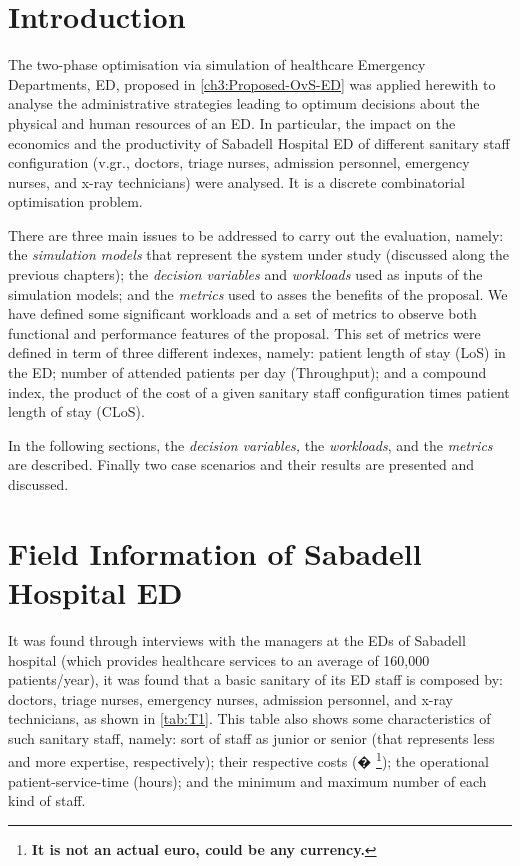 
\section{Introduction}

The two-phase optimisation via simulation of healthcare Emergency
Departments, ED, proposed in \ref{ch3:Proposed-OvS-ED} was applied
herewith to analyse the administrative strategies leading to optimum
decisions about the physical and human resources of an ED. In particular,
the impact on the economics and the productivity of Sabadell Hospital
ED of different sanitary staff configuration (v.gr., doctors, triage
nurses, admission personnel, emergency nurses, and x-ray technicians)
were analysed. It is a discrete combinatorial optimisation problem.

There are three main issues to be addressed to carry out the evaluation,
namely: the \textit{simulation models} that represent the system under
study (discussed along the previous chapters); the \textit{decision
variables} and\textit{ workloads} used as inputs of the simulation
models; and the \textit{metrics} used to asses the benefits of the
proposal. We have defined some significant workloads and a set of
metrics to observe both functional and performance features of the
proposal. This set of metrics were defined in term of three different
indexes, namely: patient length of stay (LoS) in the ED; number of
attended patients per day (Throughput); and a compound index, the
product of the cost of a given sanitary staff configuration times
patient length of stay (CLoS).

In the following sections, the \textit{decision variables, }the\textit{
workloads}, and the \textit{metrics} are described. Finally two case
scenarios and their results are presented and discussed. 


\section{Field Information of Sabadell Hospital ED}

It was found through interviews with the managers at the EDs of Sabadell
hospital (which provides healthcare services to an average of 160,000
patients/year), it was found that a basic sanitary of its ED staff
is composed by: doctors, triage nurses, emergency nurses, admission
personnel, and x-ray technicians, as shown in \ref{tab:T1}. This
table also shows some characteristics of such sanitary staff, namely:
sort of staff as junior or senior (that represents less and more expertise,
respectively); their respective costs (� \textbf{}%
\footnote{\textbf{It is not an actual euro, could be any currency.\label{fn:euro}}%
}); the operational patient-service-time (hours); and the minimum and
maximum number of each kind of staff. 

